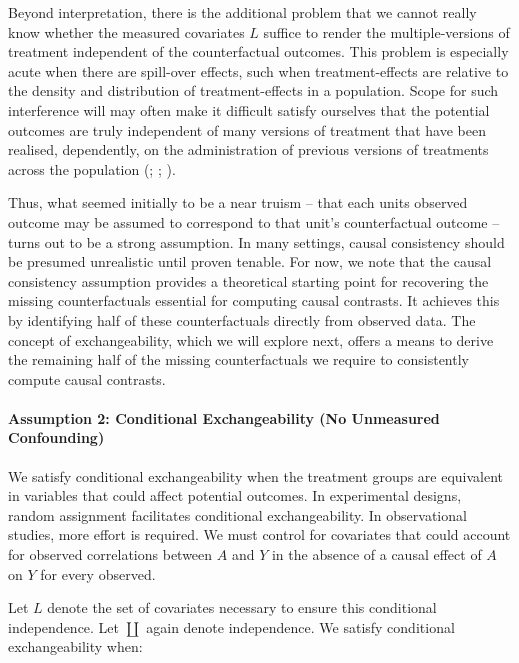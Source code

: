 \documentclass[
  singlecolumn,
  9pt]{article}
\let\oldparagraph\paragraph
\renewcommand{\paragraph}[1]{\oldparagraph{#1}\mbox{}}
\begin{document}
Beyond interpretation, there is the additional problem that we cannot
really know whether the measured covariates \(L\) suffice to render the
multiple-versions of treatment independent of the counterfactual
outcomes. This problem is especially acute when there are spill-over
effects, such when treatment-effects are relative to the density and
distribution of treatment-effects in a population. Scope for such
interference will may often make it difficult satisfy ourselves that the
potential outcomes are truly independent of many versions of treatment
that have been realised, dependently, on the administration of previous
versions of treatments across the population
(;
;
).

Thus, what seemed initially to be a near truism -- that each units
observed outcome may be assumed to correspond to that unit's
counterfactual outcome -- turns out to be a strong assumption. In many
settings, causal consistency should be presumed unrealistic until proven
tenable. For now, we note that the causal consistency assumption
provides a theoretical starting point for recovering the missing
counterfactuals essential for computing causal contrasts. It achieves
this by identifying half of these counterfactuals directly from observed
data. The concept of exchangeability, which we will explore next, offers
a means to derive the remaining half of the missing counterfactuals we
require to consistently compute causal contrasts.

\paragraph{Assumption 2: Conditional Exchangeability (No Unmeasured
Confounding)}\label{assumption-2-conditional-exchangeability-no-unmeasured-confounding}

We satisfy conditional exchangeability when the treatment groups are
equivalent in variables that could affect potential outcomes. In
experimental designs, random assignment facilitates conditional
exchangeability. In observational studies, more effort is required. We
must control for covariates that could account for observed correlations
between \(A\) and \(Y\) in the absence of a causal effect of \(A\) on
\(Y\) for every observed.

Let \(L\) denote the set of covariates necessary to ensure this
conditional independence. Let \(\coprod\) again denote independence. We
satisfy conditional exchangeability when:
\end{document}
